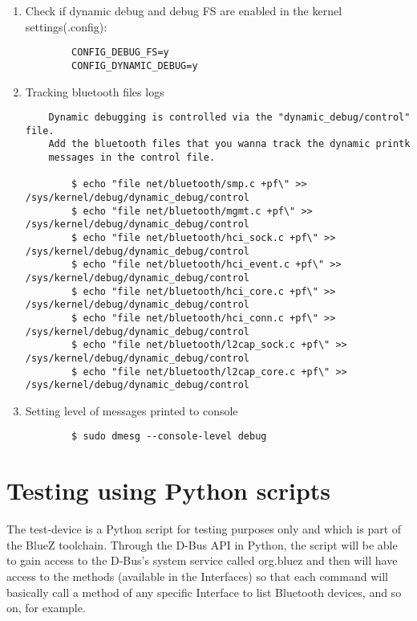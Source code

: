 \documentclass[11pt]{article}
\begin{document}
\begin{enumerate}
	\item Check if dynamic debug and debug FS are enabled in the kernel settings(.config):

	\begin{verbatim}
		CONFIG_DEBUG_FS=y
		CONFIG_DYNAMIC_DEBUG=y
	\end{verbatim}

	\item Tracking bluetooth files logs

	\begin{verbatim}
	Dynamic debugging is controlled via the "dynamic_debug/control" file.
	Add the bluetooth files that you wanna track the dynamic printk
	messages in the control file.

		$ echo "file net/bluetooth/smp.c +pf\" >> /sys/kernel/debug/dynamic_debug/control
		$ echo "file net/bluetooth/mgmt.c +pf\" >> /sys/kernel/debug/dynamic_debug/control
		$ echo "file net/bluetooth/hci_sock.c +pf\" >> /sys/kernel/debug/dynamic_debug/control
		$ echo "file net/bluetooth/hci_event.c +pf\" >> /sys/kernel/debug/dynamic_debug/control
		$ echo "file net/bluetooth/hci_core.c +pf\" >> /sys/kernel/debug/dynamic_debug/control
		$ echo "file net/bluetooth/hci_conn.c +pf\" >> /sys/kernel/debug/dynamic_debug/control
		$ echo "file net/bluetooth/l2cap_sock.c +pf\" >> /sys/kernel/debug/dynamic_debug/control
		$ echo "file net/bluetooth/l2cap_core.c +pf\" >> /sys/kernel/debug/dynamic_debug/control
	\end{verbatim}

	\item Setting level of messages printed to console

		\begin{verbatim}
		$ sudo dmesg --console-level debug
		\end{verbatim}
\end{enumerate}

\section{Testing using Python scripts}

The test-device is a Python script for testing purposes only and which is part
of the BlueZ toolchain. Through the D-Bus API in Python, the script
will be able to gain access to the D-Bus's system service called
org.bluez and then will have access to the methods (available in the
Interfaces) so that each command will basically call a method of any
specific Interface to list Bluetooth devices, and so on, for example.
\end{document}
